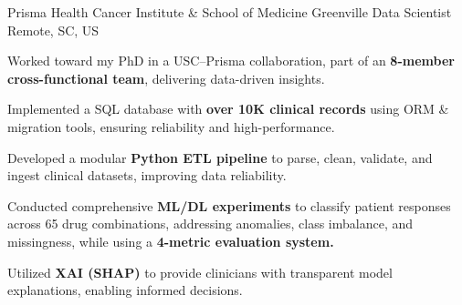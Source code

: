 
\vspace*{-0.2cm}

\begin{cventries}


\cventry
    {Prisma Health Cancer Institute \hspace{0.1cm} \& \hspace{0.1cm} School of Medicine Greenville}
    {Data Scientist}
    {}
    {Remote, SC, US}
    {
        \begin{cvitemsfree}
            \item{Worked toward my PhD in a USC--Prisma collaboration, part of an \textbf{8-member cross-functional team}, delivering data-driven insights.}
            \item{Implemented a SQL database with \textbf{over 10K clinical records} using ORM \& migration tools, ensuring reliability and high-performance.} %
            \item{Developed a modular \textbf{Python ETL pipeline} to parse, clean, validate, and ingest clinical datasets, improving data reliability.}
            \item{Conducted comprehensive \textbf{ML/DL experiments} to classify patient responses across 65 drug combinations, addressing anomalies, class imbalance, and missingness, while using a \textbf{4-metric evaluation system.}}
            \item{Utilized \textbf{XAI (SHAP)} to provide clinicians with transparent model explanations, enabling informed decisions.}
        \end{cvitemsfree}
    }

\vspace*{0.2cm}


\end{cventries}
